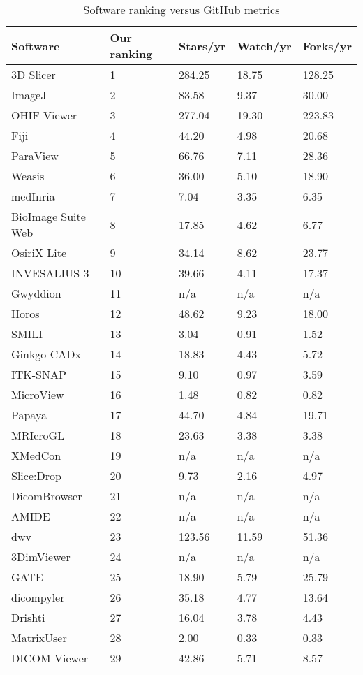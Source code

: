 \begingroup
\renewcommand{\arraystretch}{0.85}
\begin{table}[H]
\centering
\begin{tabular}{lllll}
\hline
Software & Our ranking & Stars/yr & Watch/yr & Forks/yr \\ \hline
3D Slicer & 1 & 284.25 & 18.75 & 128.25 \\
ImageJ & 2 & 83.58 & 9.37 & 30.00 \\
OHIF Viewer & 3 & 277.04 & 19.30 & 223.83 \\
Fiji & 4 & 44.20 & 4.98 & 20.68 \\
ParaView & 5 & 66.76 & 7.11 & 28.36 \\
Weasis & 6 & 36.00 & 5.10 & 18.90 \\
medInria & 7 & 7.04 & 3.35 & 6.35 \\
BioImage Suite Web & 8 & 17.85 & 4.62 & 6.77 \\
OsiriX Lite & 9 & 34.14 & 8.62 & 23.77 \\
INVESALIUS 3 & 10 & 39.66 & 4.11 & 17.37 \\
Gwyddion & 11 & n/a & n/a & n/a \\
Horos & 12 & 48.62 & 9.23 & 18.00 \\
SMILI & 13 & 3.04 & 0.91 & 1.52 \\
Ginkgo CADx & 14 & 18.83 & 4.43 & 5.72 \\
ITK-SNAP & 15 & 9.10 & 0.97 & 3.59 \\
MicroView & 16 & 1.48 & 0.82 & 0.82 \\
Papaya & 17 & 44.70 & 4.84 & 19.71 \\
MRIcroGL & 18 & 23.63 & 3.38 & 3.38 \\
XMedCon & 19 & n/a & n/a & n/a \\
Slice:Drop & 20 & 9.73 & 2.16 & 4.97 \\
DicomBrowser & 21 & n/a & n/a & n/a \\
AMIDE & 22 & n/a & n/a & n/a \\
dwv & 23 & 123.56 & 11.59 & 51.36 \\
3DimViewer & 24 & n/a & n/a & n/a \\
GATE & 25 & 18.90 & 5.79 & 25.79 \\
dicompyler & 26 & 35.18 & 4.77 & 13.64 \\
Drishti & 27 & 16.04 & 3.78 & 4.43 \\
MatrixUser & 28 & 2.00 & 0.33 & 0.33 \\
DICOM Viewer & 29 & 42.86 & 5.71 & 8.57 \\ \hline
\end{tabular}
\caption{\label{tab_ranking_vs_GitHub}Software ranking versus GitHub metrics}
\end{table}
\endgroup

